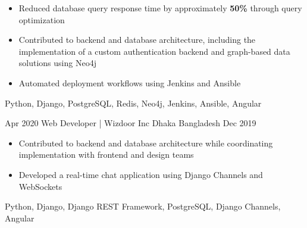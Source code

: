 \begin{experiences}
{\begin{itemize}
                \item Reduced database query response time by approximately
                      \textbf{50\%} through query optimization

                \item Contributed to backend and database architecture, including
                      the implementation of a custom authentication backend and
                      graph-based data solutions using Neo4j

                \item Automated deployment workflows using Jenkins and Ansible
            \end{itemize}
        }
        {Python, Django, PostgreSQL, Redis, Neo4j, Jenkins, Ansible, Angular}

    \emptySeparator


    \experience
        {Apr 2020}
        {Web Developer | Wizdoor Inc}
        {Dhaka}
        {Bangladesh}
        {Dec 2019}
        {
            \begin{itemize}
                \item Contributed to backend and database architecture while
                      coordinating implementation with frontend and design teams

                \item Developed a real-time chat application using Django Channels
                      and WebSockets
            \end{itemize}
        }
        {Python, Django, Django REST Framework, PostgreSQL, Django Channels, Angular}

\end{experiences}
